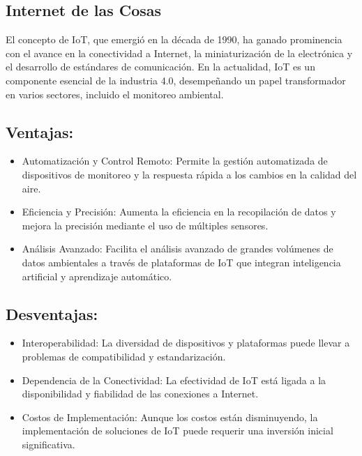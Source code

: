 \subsection{Internet de las Cosas}
El concepto de IoT, que emergió en la década de 1990, ha ganado prominencia con el avance en la conectividad a Internet, la miniaturización de la electrónica y el desarrollo de estándares de comunicación. En la actualidad, IoT es un componente esencial de la industria 4.0, desempeñando un papel transformador en varios sectores, incluido el monitoreo ambiental.

\subsection{Ventajas:}

\begin{itemize}
\item Automatización y Control Remoto: Permite la gestión automatizada de dispositivos de monitoreo y la respuesta rápida a los cambios en la calidad del aire.

\item Eficiencia y Precisión: Aumenta la eficiencia en la recopilación de datos y mejora la precisión mediante el uso de múltiples sensores.

\item Análisis Avanzado: Facilita el análisis avanzado de grandes volúmenes de datos ambientales a través de plataformas de IoT que integran inteligencia artificial y aprendizaje automático.
\end{itemize}



\subsection{Desventajas:}

\begin{itemize}
\item Interoperabilidad: La diversidad de dispositivos y plataformas puede llevar a problemas de compatibilidad y estandarización.

\item Dependencia de la Conectividad: La efectividad de IoT está ligada a la disponibilidad y fiabilidad de las conexiones a Internet.

\item Costos de Implementación: Aunque los costos están disminuyendo, la implementación de soluciones de IoT puede requerir una inversión inicial significativa.
\end{itemize}


